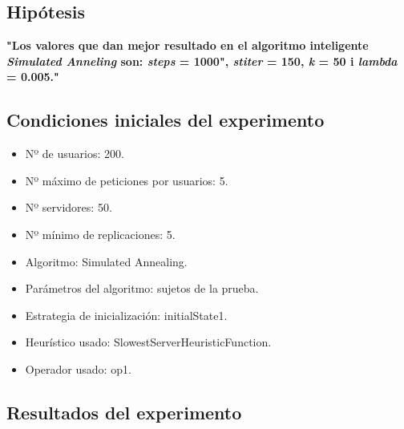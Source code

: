 \documentclass[a4paper,10pt]{report}
\begin{document}
		
		\subsection*{Hipótesis}
		\textbf{"Los valores que dan mejor resultado en el algoritmo inteligente \textit{Simulated Anneling} son: \textit{steps} = 1000", \textit{stiter} = 150, \textit{k} = 50 i \textit{lambda} = 0.005."}
		
		\subsection*{Condiciones iniciales del experimento}
		\begin{itemize}
		    \item Nº de usuarios: 200.
    		\item Nº máximo de peticiones por usuarios: 5.
    		\item Nº servidores: 50.
    		\item Nº mínimo de replicaciones: 5.
    		\item Algoritmo: Simulated Annealing.
    		\item Parámetros del algoritmo: sujetos de la prueba. 
    		\item Estrategia de inicialización: initialState1.
    		\item Heurístico usado: SlowestServerHeuristicFunction.
    		\item Operador usado: op1.
		\end{itemize}

		\subsection*{Resultados del experimento}
		
\end{document}

